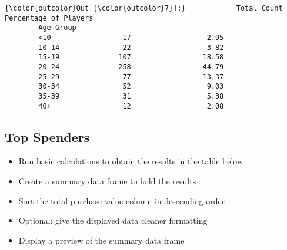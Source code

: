 \documentclass[11pt]{article}
\begin{document}
\begin{Verbatim}[commandchars=\\\{\}]
{\color{outcolor}Out[{\color{outcolor}7}]:}            Total Count Percentage of Players
        Age Group                                   
        <10                 17                  2.95
        10-14               22                  3.82
        15-19              107                 18.58
        20-24              258                 44.79
        25-29               77                 13.37
        30-34               52                  9.03
        35-39               31                  5.38
        40+                 12                  2.08
\end{Verbatim}
            
    \subsection{Top Spenders}\label{top-spenders}

    \begin{itemize}
\item
  Run basic calculations to obtain the results in the table below
\item
  Create a summary data frame to hold the results
\item
  Sort the total purchase value column in descending order
\item
  Optional: give the displayed data cleaner formatting
\item
  Display a preview of the summary data frame
\end{itemize}
\end{document}
